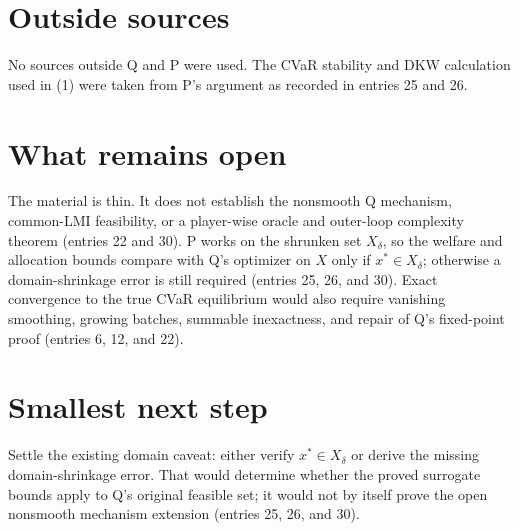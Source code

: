 \documentclass{article}
\begin{document}
\section*{Outside sources}
No sources outside Q and P were used. The CVaR stability and DKW calculation used in (1) were taken from P's argument as recorded in entries 25 and 26.

\section*{What remains open}
The material is thin. It does not establish the nonsmooth Q mechanism, common-LMI feasibility, or a player-wise oracle and outer-loop complexity theorem (entries 22 and 30). P works on the shrunken set $X_\delta$, so the welfare and allocation bounds compare with Q's optimizer on $X$ only if $x^*\in X_\delta$; otherwise a domain-shrinkage error is still required (entries 25, 26, and 30). Exact convergence to the true CVaR equilibrium would also require vanishing smoothing, growing batches, summable inexactness, and repair of Q's fixed-point proof (entries 6, 12, and 22).

\section*{Smallest next step}
Settle the existing domain caveat: either verify $x^*\in X_\delta$ or derive the missing domain-shrinkage error. That would determine whether the proved surrogate bounds apply to Q's original feasible set; it would not by itself prove the open nonsmooth mechanism extension (entries 25, 26, and 30).
\end{document}
